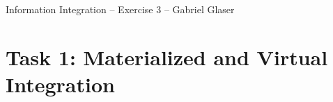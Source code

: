 \documentclass{scrartcl}
\begin{document}
	\begin{center}
		\LARGE
		Information Integration -- Exercise 3 -- Gabriel Glaser
	\end{center}
	\vspace{1cm}
	\section*{Task 1: Materialized and Virtual Integration}
	\begin{center}
	\end{center}
\end{document}
